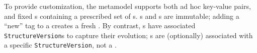 \documentclass{sig-alternate}
\begin{document}
To provide customization, the \mantle metamodel supports
both ad hoc {\gtag} key-value pairs, and fixed {\structure}s containing a prescribed set of {\gtag}s. 
{\version}s and {\gtag}s are immutable; adding a ``new'' tag to a \thing creates a fresh
\version. By contrast, {\structure}s have associated \texttt{StructureVersion}s to capture their evolution; {\version}s are (optionally) associated with a specific \texttt{StructureVersion}, not a \structure.

\end{document}

